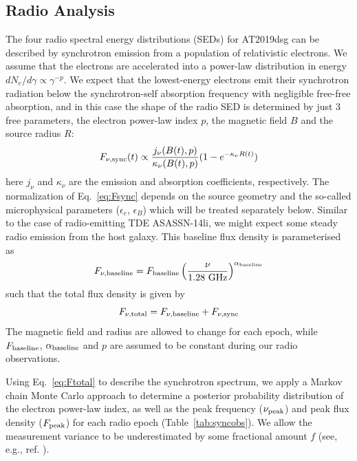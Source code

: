 \documentclass{nature_plusfigure}
\begin{document}
\begin{methods}
\section{Radio Analysis}
The four radio spectral energy distributions (SEDs) for AT2019dsg can be described by synchrotron emission from a population of relativistic electrons. We assume that the electrons are accelerated into a power-law distribution in energy $dN_{e}/d\gamma \propto \gamma^{-p}$. We expect that the lowest-energy electrons emit their synchrotron radiation below the synchrotron-self absorption frequency with negligible free-free absorption, and in this case the shape of the radio SED is determined by just 3 free parameters, the electron power-law index $p$, the magnetic field $B$ and the source radius $R$: 
\begin{equation}\label{eq:Fsync}
    F_{\nu,\rm sync}(t) \propto \frac{j_\nu(B(t), p)}{\kappa_\nu(B(t), p)} (1-e^{-\kappa_\nu R(t)})
\end{equation}
here $j_\nu$ and $\kappa_\nu$ are the emission and absorption coefficients, respectively. The normalization of Eq.~\ref{eq:Fsync} depends on the source geometry and the so-called microphysical parameters ($\epsilon_e$, $\epsilon_B$) which will be treated separately below.  Similar to the case of radio-emitting TDE ASASSN-14li\cite{2016Sci...351...62V,2016ApJ...819L..25A}, we might expect some steady radio emission from the host galaxy. This baseline flux density is parameterised as 
\begin{equation}\label{eq:Fhost}
    F_{\nu,\rm baseline} = F_{\rm baseline} \left(\frac{\nu}{1.28 \textup{ GHz}}\right)^{\alpha_{\rm baseline}}
\end{equation}
such that the total flux density is given by 
\begin{equation}\label{eq:Ftotal}
    F_{\nu,\rm total} = F_{\nu \rm, baseline} + F_{\nu,\rm sync} 
\end{equation}
The magnetic field and radius are allowed to change for each epoch, while $F_{\rm baseline}$, $\alpha_{\rm baseline}$ and $p$ are assumed to be constant during our radio observations. 

Using Eq.~\ref{eq:Ftotal} to describe the synchrotron spectrum, we apply a Markov chain Monte Carlo approach\cite{Foreman-Mackey13} to determine a posterior probability distribution of the electron power-law index, as well as the peak frequency ($\nu_{\rm peak}$) and peak flux density ($F_{\rm peak}$) for each radio epoch (Table~\ref{tab:syncobs}). We allow the measurement variance to be underestimated by some fractional amount $f$ (see, e.g., ref. \cite{Guillochon18}). 


\end{methods}
\end{document}
